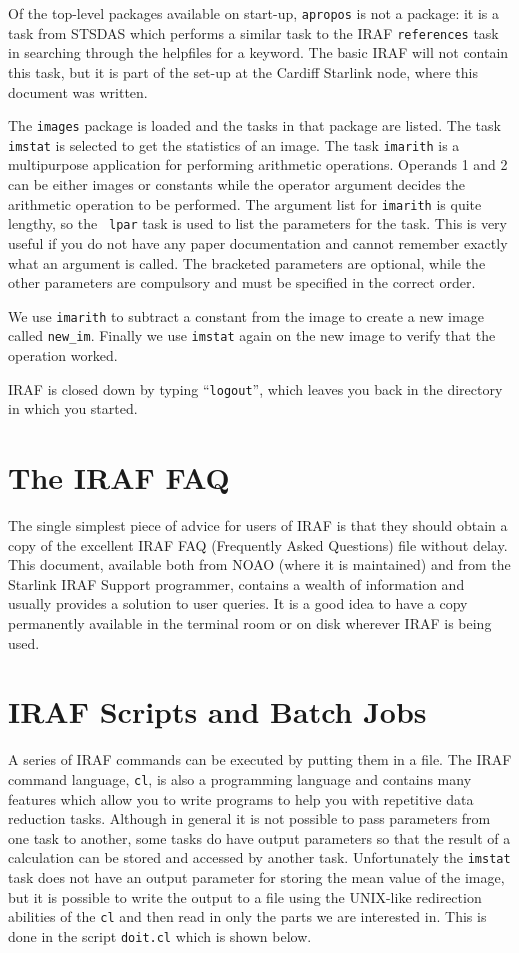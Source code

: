 Of the top-level packages available on start-up, {\tt apropos} is not
a package: it is a task from STSDAS which performs a similar task to
the IRAF {\tt references} task in searching through the helpfiles for
a keyword. The basic IRAF will not contain this task, but it is part
of the set-up at the Cardiff Starlink node,
where this document was written.

The {\tt images} package is loaded and the tasks in that package are
listed.  The task {\tt imstat} is selected to get the statistics of an
image. The task {\tt imarith} is a multipurpose application
for performing arithmetic
operations. Operands 1 and 2 can be either images or constants while
the operator argument decides the arithmetic operation to be
performed. The argument list for {\tt imarith} is quite lengthy, so the {\tt
lpar} task is used to list the parameters for the task. This is very
useful if you do not have any paper documentation and cannot remember
exactly what an argument is called. The bracketed parameters are
optional, while the other parameters are compulsory and must be specified in
the correct order.

We use {\tt imarith} to subtract a constant from the image to create
a new image called {\tt new\_im}. Finally we use {\tt imstat} again on the
new image to verify that the operation worked.

IRAF is closed down by typing ``{\tt logout}'', which leaves you back in
the directory in which you started.

\section{The IRAF FAQ}

The single simplest piece of advice for users of IRAF is that they 
should obtain a copy of the excellent IRAF FAQ (Frequently Asked Questions)
file without delay.  This document, available both from NOAO
(where it is maintained) 
and from the Starlink IRAF Support programmer, contains a wealth
of information and usually provides a solution to user queries.
It is a good idea to have a copy permanently available in the terminal room
or on disk wherever IRAF is being used.


\section{IRAF Scripts and Batch Jobs}

A series of IRAF commands can be executed by putting them in a
file. The IRAF command language, {\tt cl}, is also a programming language
and contains many features which allow you to write programs to help
you with repetitive data reduction tasks. Although in general it is
not possible to pass parameters from one task to another, some tasks
do have output parameters so that the result of a calculation can be
stored and accessed by another task. Unfortunately the {\tt imstat}
task does not have an output parameter for storing the mean value of
the image, but it is possible to write the output to a file using the
UNIX-like redirection abilities of the {\tt cl} and then read in only the
parts we are interested in. This is done in the script {\tt doit.cl}
which is shown below. 

